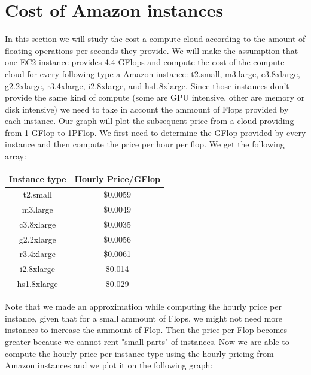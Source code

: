 \documentclass[12pt,journal, a4paper]{IEEEtran}
\begin{document}
\section{Cost of Amazon instances}
In this section we will study the cost a compute cloud according to the amount of floating operations per seconds they provide. We will make the assumption that one EC2 instance provides 4.4 GFlops and compute the cost of the compute cloud for every following type a Amazon instance: t2.small, m3.large, c3.8xlarge, g2.2xlarge, r3.4xlarge, i2.8xlarge, and hs1.8xlarge. Since those instances don't provide the same kind of compute (some are GPU intensive, other are memory or disk intensive) we need to take in account the ammount of Flops provided by each instance. Our graph will plot the subsequent price from a cloud providing from 1 GFlop to 1PFlop. We first need to determine the GFlop provided by every instance and then compute the price per hour per flop. We get the following array:\\
\begin{table}[H]
\begin{center}

   \begin{tabular}{ | c | c | }

     \hline

     Instance type & Hourly Price/GFlop  \\ \hline

     t2.small & \$0.0059\\ \hline

     m3.large & \$0.0049\\ \hline

     c3.8xlarge & \$0.0035\\ \hline

     g2.2xlarge & \$0.0056\\ \hline
     
     r3.4xlarge & \$0.0061\\ \hline
     
     i2.8xlarge & \$0.014\\ \hline

     hs1.8xlarge & \$0.029\\

     \hline
        
   \end{tabular}
 \end{center} 
\end{table}
Note that we made an approximation while computing the hourly price per instance, given that for a small ammount of Flops, we might not need more instances to increase the ammount of Flop. Then the price per Flop becomes greater because we cannot rent "small parts" of instances.  
Now we are able to compute the hourly price per instance type using the hourly pricing from Amazon instances and we plot it on the following graph:\\
 
\end{document}
